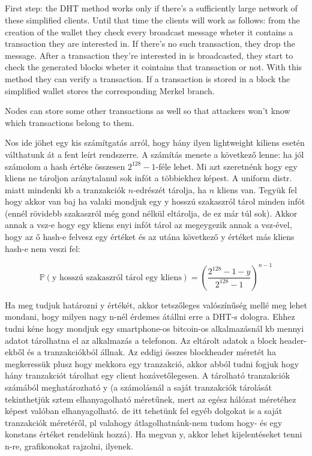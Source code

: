 \documentclass[a4paper,12pt]{article}
\begin{document}


\subsection{}
First step: the DHT method works only if there's a sufficiently large network of these simplified clients. Until that time the clients will work as follows: from the creation of the wallet they check every broadcast message wheter it contains a transaction they are interested in. If there's no such transaction, they drop the message. After a transaction they're interested in is broadcasted, they start to check the generated blocks wheter it cointains that transaction or not. With this method they can verify a transaction. If a transaction is stored in a block the simplified wallet stores the corresponding Merkel branch.

Nodes can store some other transactions as well so that attackers won't know which transactions belong to them.

Nos ide jöhet egy kis számítgatás arról, hogy hány ilyen lightweight kiliens esetén válthatunk át a fent leírt rendszerre. A számítás menete a következő lenne: ha jól számolom a hash értéke összesen $2^{128}-1$-féle lehet. Mi azt szeretnénk hogy egy kliens ne tároljon aránytalanul sok infót a többiekhez képest. A uniform distr. miatt mindenki kb a tranzakciók $n$-edrészét tárolja, ha $n$ kliens van. Tegyük fel hogy akkor van baj ha valaki mondjuk egy y hosszú szakaszról tárol minden infót (ennél rövidebb szakaszról még gond nélkül eltárolja, de ez már túl sok). Akkor annak a vsz-e hogy egy kliens enyi infót tárol az megeygezik annak a vsz-ével, hogy az ő hash-e felvesz egy értéket és az utána következő y értéket más kliens hash-e nem veszi fel:

$$\mathbb{P}(\text{y hosszú szakaszról tárol egy kliens})=\left(\frac{2^{128}-1-y}{2^{128}-1}\right)^{n-1}$$

Ha meg tudjuk határozni y értékét, akkor tetszőleges valószínűség mellé meg lehet mondani, hogy milyen nagy n-nél érdemes átállni erre a DHT-s dologra. Ehhez tudni kéne hogy mondjuk egy smartphone-os bitcoin-os alkalmazásnál kb mennyi adatot tárolhatna el az alkalmazás a telefonon. Az eltárolt adatok a block header-ekből és a tranzakciókból állnak. Az eddigi összes blockheader méretét ha megkeressük plusz hogy mekkora egy tranzakció, akkor abból tudni fogjuk hogy hány tranzakciót tárolhat egy client hozávetőlegesen. A tárolható tranzakciók számából meghatározható y (a számolásnál a saját tranzakciók tárolását tekinthetjük sztem elhanyagolható méretűnek, mert az egész hálózat méretéhez képest valóban elhanyagolható. de itt tehetünk fel egyéb dolgokat is a saját tranzakciók méretéről, pl valahogy átlagolhatnánk-nem tudom hogy- és egy konstans értéket rendelünk hozzá). Ha megvan y, akkor lehet kijelentéseket tenni n-re, grafikonokat rajzolni, ilyenek.
\end{document}
